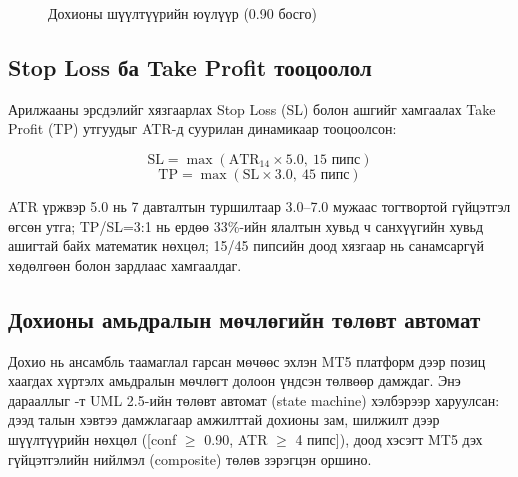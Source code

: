 \begin{figure}[H]
\caption{Дохионы шүүлтүүрийн юүлүүр (0.90 босго)}
\label{fig:signal_funnel}
\end{figure}

\subsection{Stop Loss ба Take Profit тооцоолол}

Арилжааны эрсдэлийг хязгаарлах Stop Loss (SL) болон ашгийг хамгаалах Take Profit (TP) утгуудыг ATR-д суурилан динамикаар тооцоолсон:

\begin{equation}
    \text{SL} = \max(\text{ATR}_{14} \times 5.0,\ 15\text{ пипс})
\end{equation}
\begin{equation}
    \text{TP} = \max(\text{SL} \times 3.0,\ 45\text{ пипс})
\end{equation}

ATR үржвэр 5.0 нь 7 давталтын туршилтаар 3.0--7.0 мужаас тогтвортой гүйцэтгэл өгсөн утга; TP/SL=3:1 нь ердөө 33\%-ийн ялалтын хувьд ч санхүүгийн хувьд ашигтай байх математик нөхцөл; 15/45 пипсийн доод хязгаар нь санамсаргүй хөдөлгөөн болон зардлаас хамгаалдаг.

\subsection{Дохионы амьдралын мөчлөгийн төлөвт автомат}
\label{sec:signal_lifecycle}

Дохио нь ансамбль таамаглал гарсан мөчөөс эхлэн MT5 платформ дээр позиц хаагдах хүртэлх амьдралын мөчлөгт долоон үндсэн төлвөөр дамждаг. Энэ дарааллыг -т UML 2.5-ийн төлөвт автомат (state machine) хэлбэрээр харуулсан: дээд талын хэвтээ дамжлагаар амжилттай дохионы зам, шилжилт дээр шүүлтүүрийн нөхцөл ([conf $\geq$ 0.90, ATR $\geq$ 4 пипс]), доод хэсэгт MT5 дэх гүйцэтгэлийн нийлмэл (composite) төлөв зэрэгцэн оршино.

